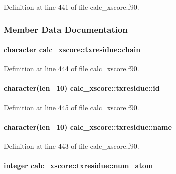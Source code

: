 Definition at line 441 of file calc\-\_\-xscore.\-f90.



\subsubsection{Member Data Documentation}
\hypertarget{structcalc__xscore_1_1txresidue_a676078b072025e9bbe755714dc2f601c}{
\paragraph[{chain}]{\setlength{\rightskip}{0pt plus 5cm}character calc\-\_\-xscore\-::txresidue\-::chain}}\label{structcalc__xscore_1_1txresidue_a676078b072025e9bbe755714dc2f601c}


Definition at line 444 of file calc\-\_\-xscore.\-f90.

\hypertarget{structcalc__xscore_1_1txresidue_adfa1be9bb7a0b7305d1cfcb4f323be9a}{
\paragraph[{id}]{\setlength{\rightskip}{0pt plus 5cm}character(len=10) calc\-\_\-xscore\-::txresidue\-::id}}\label{structcalc__xscore_1_1txresidue_adfa1be9bb7a0b7305d1cfcb4f323be9a}


Definition at line 445 of file calc\-\_\-xscore.\-f90.

\hypertarget{structcalc__xscore_1_1txresidue_af9896b6a04f8e86fb6fb94caeed5ed11}{
\paragraph[{name}]{\setlength{\rightskip}{0pt plus 5cm}character(len=10) calc\-\_\-xscore\-::txresidue\-::name}}\label{structcalc__xscore_1_1txresidue_af9896b6a04f8e86fb6fb94caeed5ed11}


Definition at line 443 of file calc\-\_\-xscore.\-f90.

\hypertarget{structcalc__xscore_1_1txresidue_a5eacf73d1159dfb7e30248b76329f062}{
\paragraph[{num\-\_\-atom}]{\setlength{\rightskip}{0pt plus 5cm}integer calc\-\_\-xscore\-::txresidue\-::num\-\_\-atom}}\label{structcalc__xscore_1_1txresidue_a5eacf73d1159dfb7e30248b76329f062}


